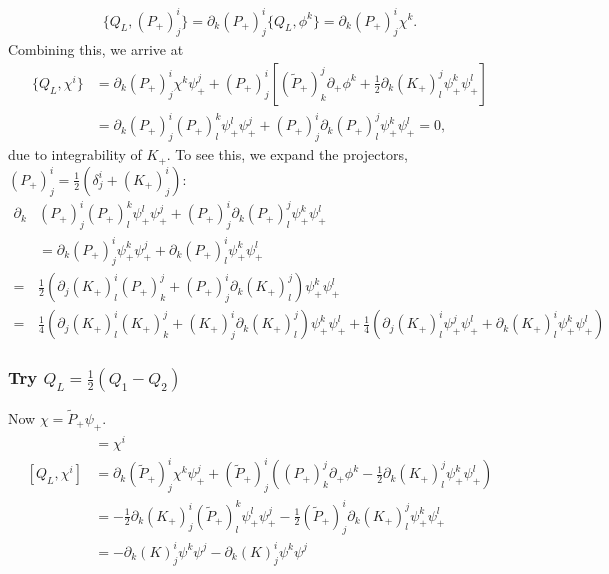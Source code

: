 \documentclass{article}
\newcommand{\p}{\partial}
\def\tl{\tilde}
\theoremstyle{definition}
\theoremstyle{definition}
\theoremstyle{remark}
\begin{document}
\begin{align}
\{Q_L,(P_+)^i_j\}=\p_k(P_+)^i_j\{Q_L,\phi^k\}=\p_k(P_+)^i_j\chi^k.
\end{align}
Combining this, we arrive at
\begin{align*}
\{Q_L,\chi^i\}&=\p_k(P_+)^i_j\chi^k\psi_+^j+(P_+)^i_j[(\tl{P}_+)^j_k\p_+\phi^k+\frac{1}{2}\p_k(K_+)^j_l\psi_+^k\psi_+^l]\\
&=\p_k(P_+)^i_j(P_+)^k_l\psi_+^l\psi_+^j+(P_+)^i_j\p_k(P_+)^j_l\psi_+^k\psi_+^l=0,
\end{align*}
due to integrability of $K_+$. To see this, we expand the projectors, $(P_+)^i_j=\frac{1}{2}(\delta^i_j+(K_+)^i_j)$:
\begin{align*}
\p_k&(P_+)^i_j(P_+)^k_l\psi_+^l\psi_+^j+(P_+)^i_j\p_k(P_+)^j_l\psi_+^k\psi_+^l\\
&=\p_k(P_+)^i_j\psi_+^k\psi_+^j+\p_k(P_+)^i_l\psi_+^k\psi_+^l\\
=&\frac{1}{2}(\p_j(K_+)^i_l(P_+)^j_k+(P_+)^i_j\p_k(K_+)^j_l)\psi_+^k\psi_+^l\\
=&\frac{1}{4}(\p_j(K_+)^i_l(K_+)^j_k+(K_+)^i_j\p_k(K_+)^j_l)\psi_+^k\psi_+^l+\frac{1}{4}(\p_j(K_+)^i_l\psi_+^j\psi_+^l+\p_k(K_+)^i_l\psi_+^k\psi_+^l)
\end{align*}

\subsubsection*{Try $Q_L=\frac{1}{2}(Q_1-Q_2)$}

Now $\chi=\tl{P}_+\psi_+$.
\begin{align*}
[Q_L,\phi^i]&=\chi^i\\
[Q_L,\chi^i]&=\p_k(\tl{P}_+)^i_j\chi^k\psi_+^j+(\tl{P}_+)^i_j((P_+)^j_k\p_+\phi^k-\frac{1}{2}\p_k(K_+)^j_l\psi_+^k\psi_+^l)\\
&=-\frac{1}{2}\p_k (K_+)^i_j(\tl{P}_+)^k_l\psi^l_+\psi_+^j-\frac{1}{2}(\tl{P}_+)^i_j\p_k (K_+)^j_l\psi_+^k\psi_+^l\\
&=-\p_k(K)^i_j\psi^k\psi^j-\p_k(K)^i_j\psi^k\psi^j
\end{align*}
\end{document}
